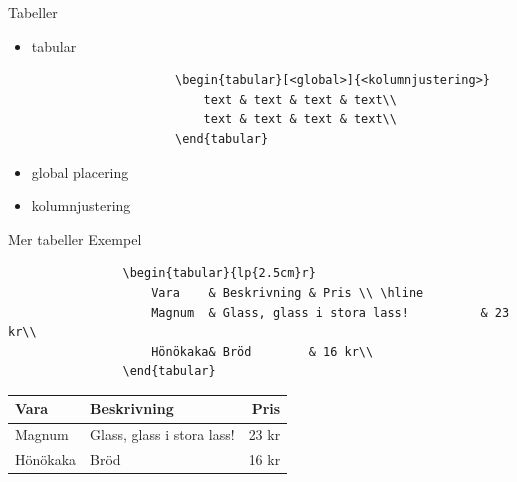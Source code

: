 \documentclass[xcolor=x11names,compress,swedish]{beamer}
\newcommand*{\Lcode}{\lstinline[{language=[LaTeX]TeX}]}
\begin{document}
		\begin{frame}[fragile]{Tabeller}
			\begin{itemize}
				\item tabular
				\begin{lstlisting}
					\begin{tabular}[<global>]{<kolumnjustering>}
						text & text & text & text\\
						text & text & text & text\\
					\end{tabular}
				\end{lstlisting}
				\item global placering
				\item kolumnjustering
				
			\end{itemize}
		\end{frame}

		\begin{frame}[fragile]{Mer tabeller}
			Exempel
			\begin{lstlisting}
				\begin{tabular}{lp{2.5cm}r}
					Vara	& Beskrivning & Pris \\ \hline
					Magnum	& Glass, glass i stora lass!		  & 23 kr\\
					Hönökaka& Bröd		  & 16 kr\\
				\end{tabular}
			\end{lstlisting}
			
			\begin{tabular}{lp{2.5cm}r}
				Vara	& Beskrivning & Pris \\ \hline
				Magnum	& Glass, glass i stora lass!		  & 23 kr\\
				Hönökaka& Bröd		  & 16 kr\\
			\end{tabular}
		\end{frame}
\end{document}
